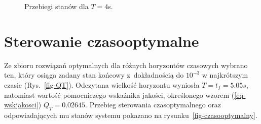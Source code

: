 \documentclass[11pt]{mwart}
\begin{document}
\begin{figure}[H]
\begin{centering}
	\caption{Przebiegi stanów dla $T=4$s.}
	\label{fig-ex2}
	\end{centering}
\end{figure}

\pagebreak
\section{Sterowanie czasooptymalne}

Ze zbioru rozwiązań optymalnych dla różnych horyzontów czasowych wybrano ten, który osiąga zadany stan końcowy z~dokładnością do $10^{-3}$ w najkrótszym czasie (Rys.~\ref{fig-QT}). Odczytana wielkość horyzontu wyniosła $T=t_{f}=5.05s$, natomiast wartość pomocniczego wskaźnika jakości, określonego wzorem (\ref{eq-wskjakosci}) $Q_{T}=0.02645$. Przebieg sterowania czasoptymalnego oraz odpowiadających mu stanów systemu pokazano na rysunku~\ref{fig-czasooptymalny}.
\end{document}
